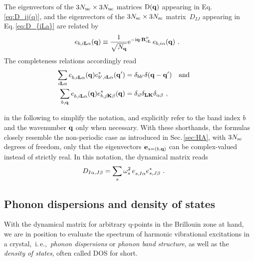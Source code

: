 The eigenvectors of the $3N_{\rm uc} \times 3N_{\rm uc}$ matrices $\mathrm D ({\bf q})$ appearing in Eq.\,\eqref{eq:D_ij(q)}, and the eigenvectors of the $3N_{\rm sc} \times 3N_{\rm sc}$ matrix~$D_{IJ}$ appearing in Eq.\,\eqref{eq:D_{iLa}} are related by
\begin{align}
	e_{b, i {\bf L} \alpha} ({\bf q})
		\equiv \frac{1}{\sqrt{N_{{\bf q}}}} {\rm e}^{- {\rm i} {\bf q}  \cdot {\bf R}^0_{i {\bf L}}} \, e_{b, i \alpha} ({\bf q})~.
\end{align}
The completeness relations accordingly read
\begin{align}
	\sum_{i \b L \alpha} \fD e_{b, i \b L \alpha} (\b q) e^\ast_{b', i \b L \alpha} (\b q') 
		&= \delta_{b b'} \delta (\b q - \b q') \quad \text{and} \quad \\
	\sum_{b, \b q} \fD e_{b, i \b L \alpha} (\b q) e^\ast_{b, j \b K \beta} (\b q)
		&= \delta_{il} \delta_{\b L \b K} \delta_{\alpha \beta}~,
	\label{eq:completeness.e_bq}
\end{align}

 in the following to simplify the notation, and explicitly refer to the band index $b$ and the wavenumber ${\bf q}$ only when necessary.
With these shorthands, the formulas closely resemble the non-periodic case as introduced in Sec.\,\ref{sec:HA}, with $3N_{\rm sc}$ degrees of freedom, only that the eigenvectors ${\bf e}_{s = (b, {\bf q})}$ can be complex-valued instead of strictly real. In this notation, the dynamical matrix reads
\begin{align}
D_{I \alpha, J \beta}
&= \sum_s \omega^{2}_{s \vphantom I} \, \fD e_{s, I \alpha} e^\ast_{s, J \beta}~.
\label{eq:D_IJ_s_complex}
\end{align}


\subsection{Phonon dispersions and density of states}
\label{sec:ha.dispersions}


With the dynamical matrix for arbitrary q-points in the Brillouin zone at hand, we are in position to evaluate the spectrum of harmonic vibrational excitations in a crystal,~i.\,e.,~\emph{phonon dispersions} or \emph{phonon band structure}, as well as the \emph{density of states}, often called DOS for short.

